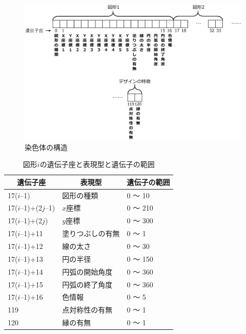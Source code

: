 \begin{figure}[b!]
    \begin{center}
    \includegraphics[scale=0.60]{image/iga_chrom.eps}
    \caption{染色体の構造}
    \label{iga_chrom}
    \end{center}
\end{figure}


\begin{table}[htbp]
	\centering
	\caption{図形$i$の遺伝子座と表現型と遺伝子の範囲}
	\begin{tabular}{|l|l|l|} \hline
    \multicolumn{1}{|c|}{遺伝子座} & \multicolumn{1}{|c|}{表現型} & \multicolumn{1}{|c|}{遺伝子の範囲}  \\ \hline
	17($i$–1)     & 図形の種類 & 0 ～ 10 \\ \hline
	17($i$–1)+(2$j$–1)   & $x$座標 & 0 ～ 210 \\ \hline
	17($i$–1)+(2$j$)     & $y$座標 & 0 ～ 300  \\ \hline 
    17($i$–1)+11      & 塗りつぶしの有無 & 0 ～ 1  \\ \hline 
    17($i$–1)+12      & 線の太さ & 0 ～ 30  \\ \hline 
    17($i$–1)+13      & 円の半径 & 0 ～ 150  \\ \hline 
    17($i$–1)+14      & 円弧の開始角度 & 0 ～ 360  \\ \hline
    17($i$–1)+15      & 円弧の終了角度 & 0 ～ 360  \\ \hline
    17($i$–1)+16      & 色情報 & 0 ～ 5  \\ \hline
    119    & 点対称性の有無 & 0 ～ 1  \\ \hline
    120      & 縁の有無 & 0 ～ 1  \\ \hline     
	\end{tabular}
	\label{chrom}
\end{table}

